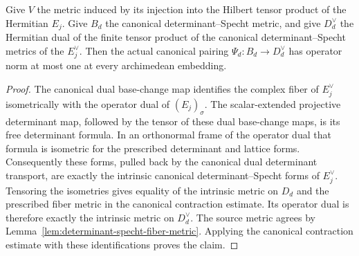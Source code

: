 \begin{lemma}
\label{lem:canonical-pairing-intrinsic-contraction}
\leanok
{}
Give $V$ the metric induced by its injection into the Hilbert tensor
product of the Hermitian $E_j$. Give $B_d$ the canonical
determinant--Specht metric, and give $D_d^\vee$ the Hermitian dual
of the finite tensor product of the canonical determinant--Specht
metrics of the $E_j^\vee$. Then the actual canonical pairing
$\Psi_d:B_d\longrightarrow D_d^\vee$ has operator norm at most one
at every archimedean embedding.
\end{lemma}
\begin{proof}
The canonical dual base-change map identifies the complex fiber of
$E_j^\vee$ isometrically with the operator dual of $(E_j)_\sigma$.
The scalar-extended projective determinant map, followed by the tensor
of these dual base-change maps, is its free determinant formula.
In an orthonormal frame of the operator dual that formula is isometric
for the prescribed determinant and lattice forms. Consequently these
forms, pulled back by the canonical dual determinant transport, are
exactly the intrinsic canonical determinant--Specht forms of
$E_j^\vee$. Tensoring the isometries gives equality of the intrinsic
metric on $D_d$ and the prescribed fiber metric in the canonical
contraction estimate. Its operator dual is therefore exactly the
intrinsic metric on $D_d^\vee$. The source metric agrees by
Lemma~\ref{lem:determinant-specht-fiber-metric}. Applying the canonical
contraction estimate with these identifications proves the claim.
\end{proof}

